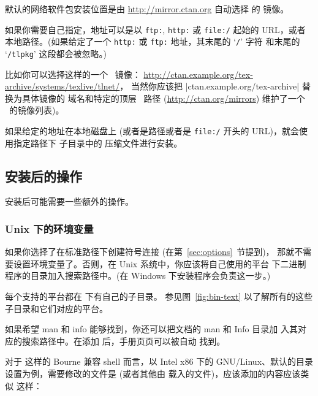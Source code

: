 \documentclass{article}
\begin{document}
默认的网络软件包安装位置是由 \url{http://mirror.ctan.org} 自动选择
的 \CTAN{} 镜像。

如果你需要自己指定，地址可以是以 \texttt{ftp:}, \texttt{http:} 或
\texttt{file:/} 起始的 URL，或者本地路径。(如果给定了一个
\texttt{http:} 或 \texttt{ftp:} 地址，其末尾的 `\texttt{/}' 字符
和末尾的 `\texttt{/tlpkg}' 这段都会被忽略。)

比如你可以选择这样的一个 \CTAN\ 镜像：
\url{http://ctan.example.org/tex-archive/systems/texlive/tlnet/}，
当然你应该把 |ctan.example.org/tex-archive| 替换为具体镜像的
域名和特定的顶层 \CTAN\ 路径 (\url{http://ctan.org/mirrors})
维护了一个 \CTAN\ 的镜像列表)。

如果给定的地址在本地磁盘上 (或者是路径或者是 \texttt{file:/}
开头的 URL)，就会使用指定路径下  子目录中的
压缩文件进行安装。

\subsection{安装后的操作}
\label{sec:postinstall}

安装后可能需要一些额外的操作。

\subsubsection{Unix 下的环境变量}
\label{sec:env}

如果你选择了在标准路径下创建符号连接 (在第~\ref{sec:options}~节提到)，
那就不需要设置环境变量了。否则，在 Unix 系统中，你应该将自己使用的平台
下二进制程序的目录加入搜索路径中。(在 Windows 下安装程序会负责这一步。)

每个支持的平台都在  下有自己的子目录。
参见图~\ref{fig:bin-text} 以了解所有的这些子目录和它们对应的平台。

如果希望 man 和 info 能够找到，你还可以把文档的 man 和 Info 目录加
入其对应的搜索路径中。在添加  后，手册页页可以被自动
找到。

对于  这样的 Bourne 兼容 shell 而言，以 Intel x86 下的
GNU/Linux、默认的目录设置为例，需要修改的文件是 
(或者其他由  载入的文件)，应该添加的内容应该类似
这样：

\end{document}
